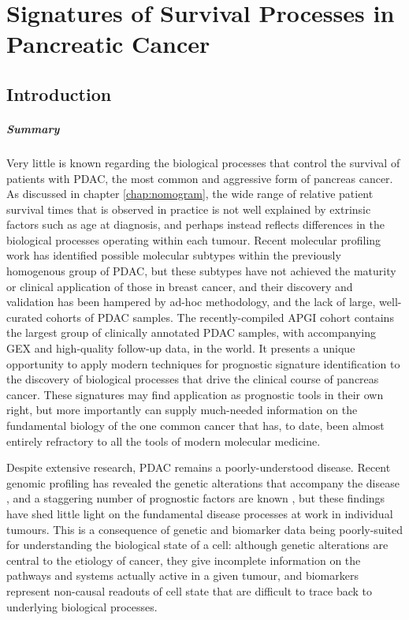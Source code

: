 \documentclass[dissertation.tex]{subfiles}
\begin{document}
\chapter{Signatures of Survival Processes in Pancreatic Cancer}
\label{chap:signatures}


\section{Introduction}

\paragraph{Summary}Very little is known regarding the biological processes that control the survival of patients with \gls{PDAC}, the most common and aggressive form of pancreas cancer.  As discussed in chapter \ref{chap:nomogram}, the wide range of relative patient survival times that is observed in practice is not well explained by extrinsic factors such as age at diagnosis, and perhaps instead reflects differences in the biological processes operating within each tumour.  Recent molecular profiling work has identified possible molecular subtypes within the previously homogenous group of \gls{PDAC}, but these subtypes have not achieved the maturity or clinical application of those in breast cancer, and their discovery and validation has been hampered by ad-hoc methodology, and the lack of large, well-curated cohorts of \gls{PDAC} samples.  The recently-compiled \gls{APGI} cohort contains the largest group of clinically annotated \gls{PDAC} samples, with accompanying \gls{GEX} and high-quality follow-up data, in the world.  It presents a unique opportunity to apply modern techniques for prognostic signature identification to the discovery of biological processes that drive the clinical course of pancreas cancer.  These signatures may find application as prognostic tools in their own right, but more importantly can supply much-needed information on the fundamental biology of the one common cancer that has, to date, been almost entirely refractory to all the tools of modern molecular medicine.

\vspace{1cm}

Despite extensive research, \gls{PDAC} remains a poorly-understood disease.  Recent genomic profiling has revealed the genetic alterations that accompany the disease \cite{Biankin2012}, and a staggering number of prognostic factors are known \cite{Harsha2009}, but these findings have shed little light on the fundamental disease processes at work in individual tumours.  This is a consequence of genetic and biomarker data being poorly-suited for understanding the biological state of a cell: although genetic alterations are central to the etiology of cancer, they give incomplete information on the pathways and systems actually active in a given tumour, and biomarkers represent non-causal readouts of cell state that are difficult to trace back to underlying biological processes.
\end{document}
